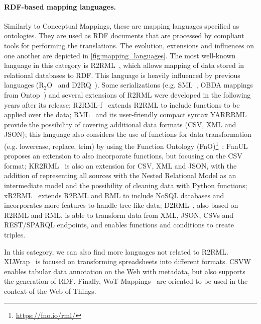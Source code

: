 \noindent\paragraph{\textbf{RDF-based mapping languages.}} Similarly to Conceptual Mappings, these are mapping languages specified as ontologies. They are used as RDF documents that are processed by compliant tools for performing the translations. The evolution, extensions and influences on one another are depicted in \cref{fig:mapping_languages}. The most well-known language in this category is R2RML~\cite{das2012r2rml}, which allows mapping of data stored in relational databases to RDF. This language is heavily influenced by previous languages (R$_2$O~\cite{barrasa2004r2o} and D2RQ~\cite{bizer2004d2rq}). Some serializations (e.g. SML~\cite{Stadler2015sml}, OBDA mappings from Ontop~\cite{rodriguez2015efficient}) and several extensions of R2RML were developed in the following years after its release: R2RML-f~\cite{debruyne2016r2rmlf} extends R2RML to include functions to be applied over the data; RML~\cite{Dimou2014rml} and its user-friendly compact syntax YARRRML~\cite{Heyvaert2018yarrrml} provide the possibility of covering additional data formats (CSV, XML and JSON); this language also considers the use of functions for data transformation (e.g. lowercase, replace, trim) by using the Function Ontology (FnO)\footnote{\url{https://fno.io/rml/}}~\cite{DeMeester2017fno_dbpedia}; FunUL~\cite{junior2016funul} proposes an extension to also incorporate functions, but focusing on the CSV format; KR2RML~\cite{slepicka2015kr2rml} is also an extension for CSV, XML and JSON, with the addition of representing all sources with the Nested Relational Model as an intermediate model and the possibility of cleaning data with Python functions; xR2RML~\cite{michel2015xr2rml} extends R2RML and RML to include NoSQL databases and incorporates more features to handle tree-like data; D2RML~\cite{chortaras2018d2rml}, also based on R2RML and RML, is able to transform data from XML, JSON, CSVs and REST/SPARQL endpoints, and enables functions and conditions to create triples. 

In this category, we can also find more languages not related to R2RML. XLWrap~\cite{langegger2009xlwrap} is focused on transforming spreadsheets into different formats. CSVW~\cite{Tennison2015csvw} enables tabular data annotation on the Web with metadata, but also supports the generation of RDF. Finally, WoT Mappings~\cite{cimmino2020ewot} are oriented to be used in the context of the Web of Things.

